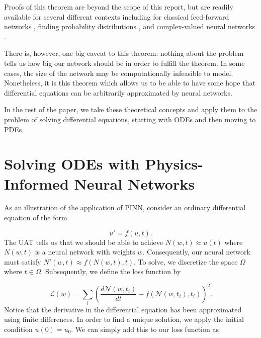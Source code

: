 \documentclass{CUP-JNL-DTM}%
\theoremstyle{definition}
\numberwithin{equation}{section}
\newcommand{\loss}{\mathcal{L}}
\newcommand{\net}{\mathcal{N}}
\begin{document}
\noindent Proofs of this theorem are beyond the scope of this report, but are readily available for several different contexts including for classical feed-forward networks \cite{hornikMultilayerFeedforwardNetworks1989, hornikApproximationCapabilitiesMultilayer1991}, finding probability distributions \cite{luUniversalApproximationTheorem2020}, and complex-valued neural networks \cite{voigtlaenderUniversalApproximationTheorem2020}. 

There is, however, one big caveat to this theorem: nothing about the problem tells us how big our network should be in order to fulfill the theorem. In some cases, the size of the network may be computationally infeasible to model. Nonetheless, it is this theorem which allows us to be able to have some hope that differential equations can be arbitrarily approximated by neural networks. 

In the rest of the paper, we take these theoretical concepts and apply them to the problem of solving differential equations, starting with ODEs and then moving to PDEs. 



\section{Solving ODEs with Physics-Informed Neural Networks}
\label{sec:ODE}

As an illustration of the application of PINN, consider an ordinary differential equation of the form 

\begin{equation}
	u' = f(u,t). 
\end{equation}
The UAT tells us that we should be able to achieve $N(w,t) \approx u(t)$ where $N(w,t)$ is a neural network with weights $w$. Consequently, our neural network must satisfy $N'(w,t) \approx f(N(w,t), t)$. To solve, we discretize the space $\Omega$ where $t \in \Omega$. Subsequently, we define the loss function by 

\begin{equation}
	\loss(w) = \sum_i \left( \frac{d\net(w, t_i)}{dt} - f(\net(w,t_i), t_i)\right)^2. 
\end{equation}
Notice that the derivative in the differential equation has been approximated using finite differences. In order to find a unique solution, we apply the initial condition $u(0) = u_0$. We can simply add this to our loss function as 
\end{document}
